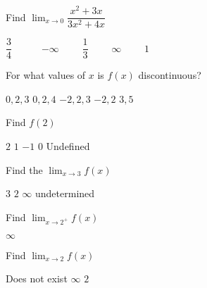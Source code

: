 \documentclass[legalpaper, 12pt, addpoints]{exam}
\begin{document}
\begin{questions}
\question Find \(\displaystyle \lim_{x\rightarrow 0}\dfrac{x^2+3x}{3x^2+4x}\) 

\begin{oneparchoices}
     	\CorrectChoice $\dfrac{3}{4} \qquad \ \  \ $
            \choice $-\infty \qquad$
            \choice $\dfrac{1}{3} \qquad$
            \choice $\infty \qquad$
            \choice $1 \qquad$
        \end{oneparchoices}
    \vspace{0.15in}
\pagebreak



\vspace{0.10in}
\question For what values of \(x\) is \(f(x)\) discontinuous?
   \begin{choices}
            \choice $0, 2, 3$
            \choice $0, 2, 4$
            \CorrectChoice $-2, 2, 3$
            \choice $-2, 2$
            \choice $3,5$
\end{choices}
 \vspace{0.1in}

\question Find \(f(2)\)
\begin{choices}
   	 \choice $2$
   	 \choice $1$
 	 \CorrectChoice $-1$
  	 \choice $0$
  	 \choice Undefined
\end{choices}
\vspace{0.1in}

\question Find the \(\lim_{x\to3} f(x) \) 
\begin{choices}
    \choice $3$
    \choice $2$
    \CorrectChoice $\infty$
   \choice undetermined
\end{choices}
\vspace{0.2in}

\question Find \(\lim_{x\to2^{+}}f(x) \) 
\begin{choices}
  	 \choice $\infty$
\end{choices}
\vspace{0.1in}

\question Find \( \lim_{x\to2} f(x)\)
\begin{choices}
    	\CorrectChoice Does not exist
  	 \choice $\infty$
  	 \choice $2$
\end{choices}
\vspace{0.1in}



\end{questions}
\end{document}
